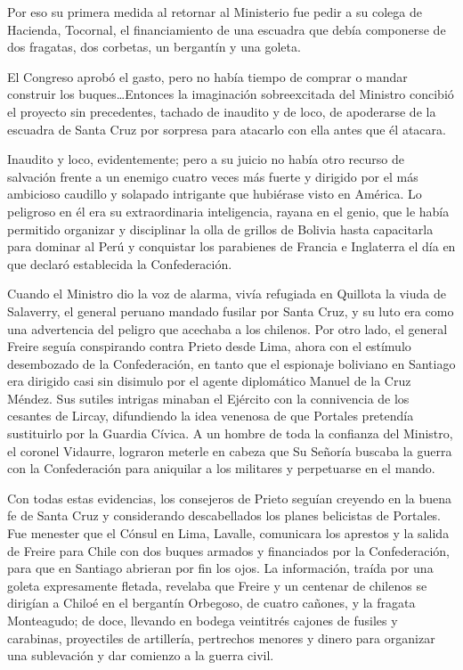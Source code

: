 \documentclass[10pt,twoside,openright]{memoir}
\begin{document}
Por eso su primera medida al retornar al Ministerio fue pedir a su
colega de Hacienda, Tocornal, el financiamiento de una escuadra que
debía componerse de dos fragatas, dos corbetas, un bergantín y una
goleta.

El Congreso aprobó el gasto, pero no había tiempo de comprar o mandar
construir los buques\ldots Entonces la imaginación sobreexcitada del
Ministro concibió el proyecto sin precedentes, tachado de inaudito y de
loco, de apoderarse de la escuadra de Santa Cruz por sorpresa para
atacarlo con ella antes que él atacara.

Inaudito y loco, evidentemente; pero a su juicio no había otro recurso
de salvación frente a un enemigo cuatro veces más fuerte y dirigido por
el más ambicioso caudillo y solapado intrigante que hubiérase visto en
América. Lo peligroso en él era su extraordinaria inteligencia, rayana
en el genio, que le había permitido organizar y disciplinar la olla de
grillos de Bolivia hasta capacitarla para dominar al Perú y conquistar
los parabienes de Francia e Inglaterra el día en que declaró establecida
la Confederación.

Cuando el Ministro dio la voz de alarma, vivía refugiada en Quillota la
viuda de Salaverry, el general peruano mandado fusilar por Santa Cruz, y
su luto era como una advertencia del peligro que acechaba a los
chilenos. Por otro lado, el general Freire seguía conspirando contra
Prieto desde Lima, ahora con el estímulo desembozado de la
Confederación, en tanto que el espionaje boliviano en Santiago era
dirigido casi sin disimulo por el agente diplomático Manuel de la Cruz
Méndez. Sus sutiles intrigas minaban el Ejército con la connivencia de
los cesantes de Lircay, difundiendo la idea venenosa de que Portales
pretendía sustituirlo por la Guardia Cívica. A un hombre de toda la
confianza del Ministro, el coronel Vidaurre, lograron meterle en cabeza
que Su Señoría buscaba la guerra con la Confederación para aniquilar a
los militares y perpetuarse en el mando.

Con todas estas evidencias, los consejeros de Prieto seguían creyendo en
la buena fe de Santa Cruz y considerando descabellados los planes
belicistas de Portales. Fue menester que el Cónsul en Lima, Lavalle,
comunicara los aprestos y la salida de Freire para Chile con dos buques
armados y financiados por la Confederación, para que en Santiago
abrieran por fin los ojos. La información, traída por una goleta
expresamente fletada, revelaba que Freire y un centenar de chilenos se
dirigían a Chiloé en el bergantín Orbegoso, de cuatro cañones, y la
fragata Monteagudo; de doce, llevando en bodega veintitrés cajones de
fusiles y carabinas, proyectiles de artillería, pertrechos menores y
dinero para organizar una sublevación y dar comienzo a la guerra civil.
\end{document}

